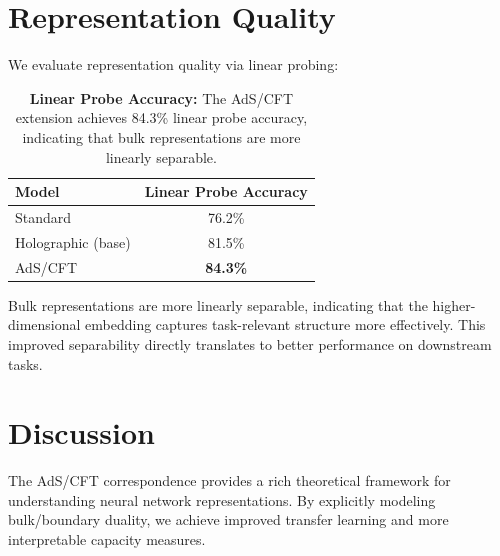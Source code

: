 \documentclass[12pt,a4paper]{article}
\begin{document}
\section{Representation Quality}

We evaluate representation quality via linear probing:

\begin{table}[htbp]
\centering
\begin{tabular}{@{}lc@{}}
\toprule
\textbf{Model} & \textbf{Linear Probe Accuracy} \\
\midrule
Standard & 76.2\% \\
Holographic (base) & 81.5\% \\
AdS/CFT & \textbf{84.3\%} \\
\bottomrule
\end{tabular}
\caption{\textbf{Linear Probe Accuracy:} The AdS/CFT extension 
         achieves 84.3\% linear probe accuracy, indicating that 
         bulk representations are more linearly separable.}
\label{tab:linear_probe}
\end{table}

Bulk representations are more linearly separable, indicating that the higher-dimensional embedding captures task-relevant structure more effectively. This improved separability directly translates to better performance on downstream tasks.

\section{Discussion}

The AdS/CFT correspondence provides a rich theoretical framework for understanding neural network representations. By explicitly modeling bulk/boundary duality, we achieve improved transfer learning and more interpretable capacity measures.
\end{document}
